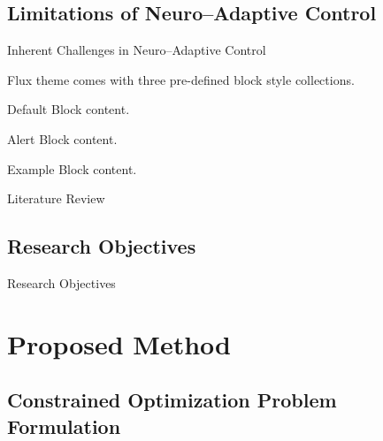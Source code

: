 \documentclass[8pt, aspectratio=169]{beamer}
\begin{document}
\subsection{Limitations of Neuro–Adaptive Control}

\begin{frame}{Inherent Challenges in Neuro–Adaptive Control}
  
  Flux theme comes with three pre-defined block style collections.\\
  
  \centering
	\begin{minipage}[b]{0.5\textwidth}

	  \begin{block}{Default}
        Block content.
      \end{block}

      \begin{alertblock}{Alert}
        Block content.
      \end{alertblock}

      \begin{exampleblock}{Example}
        Block content.
      \end{exampleblock}      
      
	\end{minipage}
\end{frame}

\begin{frame}{Literature Review}
  
\end{frame}

\subsection{Research Objectives}

\begin{frame}{Research Objectives}
  
\end{frame}

\section{Proposed Method}

\subsection{Constrained Optimization Problem Formulation}
\end{document}
